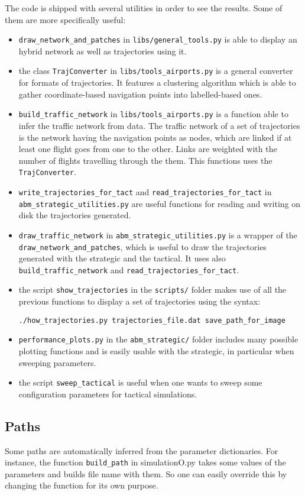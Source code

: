 \documentclass[12pt]{article}
\begin{document}
The code is shipped with several utilities in order to see the results. Some of them are more specifically useful:
\begin{itemize}
\item \verb|draw_network_and_patches| in \verb|libs/general_tools.py| is able to display an hybrid network as well as trajectories using it.
\item the class \verb|TrajConverter| in \verb|libs/tools_airports.py| is a general converter for formats of trajectories. It features a clustering algorithm which is able to gather coordinate-based navigation points into labelled-based ones.
\item \verb|build_traffic_network| in \verb|libs/tools_airports.py| is a function able to infer the traffic network from data. The traffic network of a set of trajectories is the network having the navigation points as nodes, which are linked if at least one flight goes from one to the other. Links are weighted with the number of flights travelling through the them. This functions uses the \verb|TrajConverter|.
\item \verb|write_trajectories_for_tact| and \verb|read_trajectories_for_tact| in \verb|abm_strategic_utilities.py| are useful functions for reading and writing on disk the trajectories generated.
\item \verb|draw_traffic_network| in \verb|abm_strategic_utilities.py| is a wrapper of the \verb|draw_network_and_patches|, which is useful to draw the trajectories generated with the strategic and the tactical. It uses also \verb|build_traffic_network| and \verb|read_trajectories_for_tact|.
\item the script \verb|show_trajectories| in the \verb|scripts/| folder makes use of all the previous functions to display a set of trajectories using the syntax:
\begin{verbatim}
./how_trajectories.py trajectories_file.dat save_path_for_image
\end{verbatim}
\item \verb|performance_plots.py| in the \verb|abm_strategic/| folder includes many possible plotting functions and is easily usable with the strategic, in particular when sweeping parameters.
\item  the script \verb|sweep_tactical| is useful when one wants to sweep some configuration parameters for tactical simulations.
\end{itemize}

\subsection{Paths}
Some paths are automatically inferred from the parameter dictionaries. For instance, the function \verb|build_path| in simulationO.py takes some values of the parameters and builds file name with them. So one can easily override this by changing the function for its own purpose.
\end{document}
